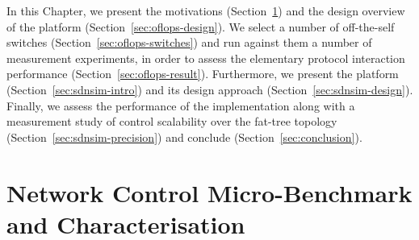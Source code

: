 In this Chapter, we present the motivations (Section~\ref{sec:oflops-intro}) and
the design overview of the \oflops platform (Section~\ref{sec:oflops-design}).
We select a number of off-the-self \of switches
(Section~\ref{sec:oflops-switches}) and run against them a number of measurement
experiments, in order to assess the elementary protocol interaction performance
(Section~\ref{sec:oflops-result}). Furthermore, we present the \sdnsim platform
(Section~\ref{sec:sdnsim-intro}) and its design approach
(Section~\ref{sec:sdnsim-design}). Finally, we assess the performance of the
\sdnsim implementation along with a measurement study of control
scalability over the fat-tree topology (Section~\ref{sec:sdnsim-precision})
and conclude (Section~\ref{sec:conclusion}). 

\section{Network Control Micro-Benchmark \\ and Characterisation} \label{sec:oflops-intro}





